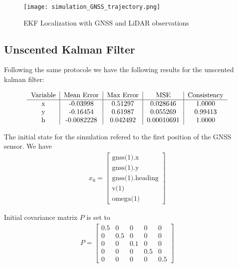\documentclass[conference]{IEEEtran}
\begin{document}
\begin{figure}[H]
    \centering
    \texttt{[image: simulation\_GNSS\_trajectory.png]}
    \caption{EKF Localization with GNSS and LiDAR observations}
    \label{fig:enter-label}
\end{figure}

\subsection{Unscented Kalman Filter}

Following the same protocole we have the following results for the unscented kalman filter:

\begin{align*}
\begin{tabular}{c|c|c|c|c} 
  Variable & Mean Error & Max Error & MSE & Consistency \\ \hline 
  x & -0.03998 & 0.51297 & 0.028646 & 1.0000 \\
  y & -0.16454 & 0.61987 &  0.055269 & 0.99413\\
  h & -0.0082228 & 0.042492 &  0.00010691 & 1.0000\\
\end{tabular}
\end{align*}


The initial state for the simulation refered to the first position of the GNSS sensor. We have \begin{align*}
   x_0 = \begin{bmatrix}
    \text{gnss(1).x} \\ 
    \text{gnss(1).y} \\
    \text{gnss(1).heading} \\
    \text{v(1)} \\
    \text{omega(1)}
    \end{bmatrix}
\end{align*}

\noindent Initial covariance matrix $P$ is set to
\begin{align*}
   P = \begin{bmatrix}
    0.5 & 0 & 0 & 0 & 0 \\ 
    0 & 0.5 & 0 & 0 & 0 \\
    0 & 0 & 0.1 & 0 & 0 \\
    0 & 0 & 0 & 0.5 & 0 \\
    0 & 0 & 0 & 0 & 0.5
    \end{bmatrix}
\end{align*}
\end{document}
